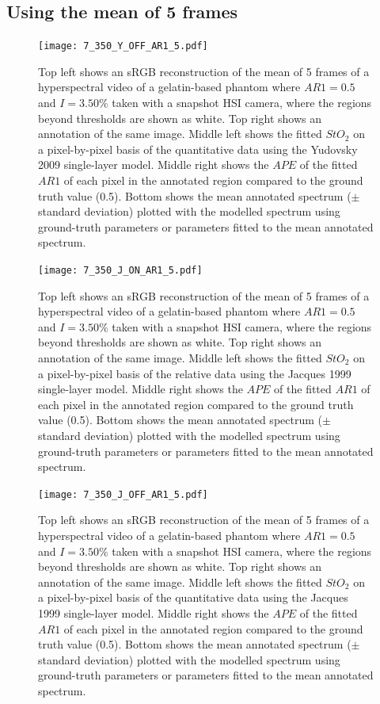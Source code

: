 \begin{subappendices}
\subsection{Using the mean of 5 frames}
\begin{figure}[h!]
    \centering 
    \texttt{[image: 7\_350\_Y\_OFF\_AR1\_5.pdf]}
    \caption{Top left shows an sRGB reconstruction of the mean of 5 frames of a hyperspectral video of a gelatin-based phantom where $AR1=0.5$ and $I=3.50\%$ taken with a snapshot HSI camera, where the regions beyond thresholds are shown as white. Top right shows an annotation of the same image. Middle left shows the fitted $StO_2$ on a pixel-by-pixel basis of the quantitative data using the Yudovsky 2009 single-layer model. Middle right shows the $APE$ of the fitted $AR1$ of each pixel in the annotated region compared to the ground truth value (0.5). Bottom shows the mean annotated spectrum ($\pm$ standard deviation) plotted with the modelled spectrum using ground-truth parameters or parameters fitted to the mean annotated spectrum.}
    \label{ap:gelatinpbpegQY5}
\end{figure}

\begin{figure}[h!]
    \centering 
    \texttt{[image: 7\_350\_J\_ON\_AR1\_5.pdf]}
    \caption{Top left shows an sRGB reconstruction of the mean of 5 frames of a hyperspectral video of a gelatin-based phantom where $AR1=0.5$ and $I=3.50\%$ taken with a snapshot HSI camera, where the regions beyond thresholds are shown as white. Top right shows an annotation of the same image. Middle left shows the fitted $StO_2$ on a pixel-by-pixel basis of the relative data using the Jacques 1999 single-layer model. Middle right shows the $APE$ of the fitted $AR1$ of each pixel in the annotated region compared to the ground truth value (0.5). Bottom shows the mean annotated spectrum ($\pm$ standard deviation) plotted with the modelled spectrum using ground-truth parameters or parameters fitted to the mean annotated spectrum.}
    \label{ap:gelatinpbpegRJ5}
\end{figure}

\begin{figure}[h!]
    \centering 
    \texttt{[image: 7\_350\_J\_OFF\_AR1\_5.pdf]}
    \caption{Top left shows an sRGB reconstruction of the mean of 5 frames of a hyperspectral video of a gelatin-based phantom where $AR1=0.5$ and $I=3.50\%$ taken with a snapshot HSI camera, where the regions beyond thresholds are shown as white. Top right shows an annotation of the same image. Middle left shows the fitted $StO_2$ on a pixel-by-pixel basis of the quantitative data using the Jacques 1999 single-layer model. Middle right shows the $APE$ of the fitted $AR1$ of each pixel in the annotated region compared to the ground truth value (0.5). Bottom shows the mean annotated spectrum ($\pm$ standard deviation) plotted with the modelled spectrum using ground-truth parameters or parameters fitted to the mean annotated spectrum.}
    \label{ap:gelatinpbpegQJ5}
\end{figure}
\FloatBarrier


\end{subappendices}
